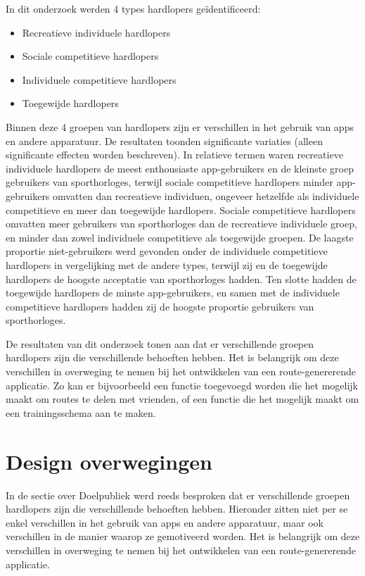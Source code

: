     In dit onderzoek werden 4 types hardlopers geïdentificeerd:
    \begin{itemize}
        \item Recreatieve individuele hardlopers
        \item Sociale competitieve hardlopers
        \item Individuele competitieve hardlopers
        \item Toegewijde hardlopers
    \end{itemize}

    Binnen deze 4 groepen van hardlopers zijn er verschillen in het gebruik van apps en andere apparatuur. 
    De resultaten toonden significante variaties (alleen significante effecten worden beschreven). 
    In relatieve termen waren recreatieve individuele hardlopers de meest enthousiaste app-gebruikers
    en de kleinste groep gebruikers van sporthorloges, terwijl sociale competitieve hardlopers minder app-gebruikers 
    omvatten dan recreatieve individuen, ongeveer hetzelfde als individuele competitieve
    en meer dan toegewijde hardlopers. Sociale competitieve hardlopers omvatten meer gebruikers van sporthorloges 
    dan de recreatieve individuele groep, en minder dan zowel individuele competitieve
    als toegewijde groepen. De laagste proportie niet-gebruikers werd gevonden 
    onder de individuele competitieve hardlopers in vergelijking met de andere types, 
    terwijl zij en de toegewijde hardlopers de hoogste acceptatie van sporthorloges hadden. 
    Ten slotte hadden de toegewijde hardlopers de minste app-gebruikers, 
    en samen met de individuele competitieve hardlopers hadden zij de hoogste proportie gebruikers van sporthorloges.

    De resultaten van dit onderzoek tonen aan dat er verschillende groepen hardlopers zijn die verschillende behoeften hebben. 
    Het is belangrijk om deze verschillen in overweging te nemen bij het ontwikkelen van een route-genererende applicatie.
    Zo kan er bijvoorbeeld een functie toegevoegd worden die het mogelijk maakt om routes te delen met vrienden,
    of een functie die het mogelijk maakt om een trainingsschema aan te maken.

    \section{Design overwegingen}

    In de sectie over Doelpubliek werd reeds besproken dat er verschillende groepen hardlopers zijn die verschillende behoeften hebben.
    Hieronder zitten niet per se enkel verschillen in het gebruik van apps en andere apparatuur, maar ook verschillen in de manier waarop ze gemotiveerd worden.
    Het is belangrijk om deze verschillen in overweging te nemen bij het ontwikkelen van een route-genererende applicatie.


